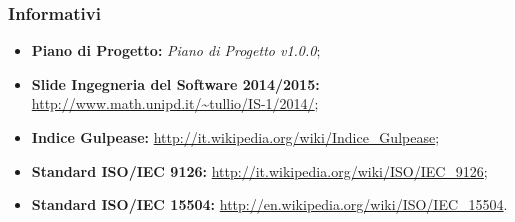 	\subsubsection{Informativi}
	\begin{itemize}
		\item \textbf{Piano di Progetto:} \textit{Piano di Progetto v1.0.0};
		\item \textbf{\gls{Slide} Ingegneria del Software 2014/2015:} \url{http://www.math.unipd.it/~tullio/IS-1/2014/};
		\item \textbf{\gls{Indice Gulpease}:} \url{http://it.wikipedia.org/wiki/Indice_Gulpease};
		\item \textbf{Standard ISO/IEC 9126:} \url{http://it.wikipedia.org/wiki/ISO/IEC_9126};
		\item \textbf{Standard ISO/IEC 15504:} \url{http://en.wikipedia.org/wiki/ISO/IEC_15504}.
	\end{itemize}

